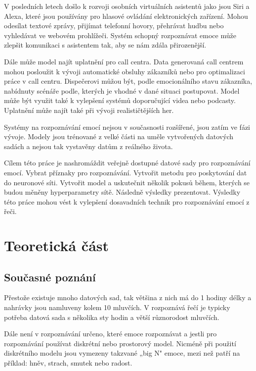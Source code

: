\documentclass[FM,BP]{tulthesis}
\begin{document}
V posledních letech došlo k rozvoji osobních virtuálních asistentů jako jsou Siri a Alexa, které jsou používány pro hlasové ovládání elektronických zařízení. Mohou odesílat textové zprávy, přijímat telefonní hovory, přehrávat hudbu nebo vyhledávat ve webovém prohlížeči. Systém schopný rozpoznávat emoce může zlepšit komunikaci s asistentem tak, aby se nám zdála přirozenější.\cite{DBLP:journals/corr/abs-1912-10458} 

Dále může model najít uplatnění pro call centra. Data generovaná call centrem mohou posloužit k vývoji automatické obsluhy zákazníků nebo pro optimalizaci práce v call centru. Dispečerovi můžou být, podle emocionálního stavu zákazníka, nabídnuty scénáře podle, kterých je vhodné v dané situaci postupovat. Model může být využit také k vylepšení systémů doporučující videa nebo podcasty. Uplatnění může najít také při vývoji realističtějších her. \cite{konar_chakraborty_2015}

Systémy na rozpoznávání emocí nejsou v současnosti rozšířené, jsou zatím ve fázi vývoje. Modely jsou trénované z velké části na uměle vytvořených datových sadách a nejsou tak vystavěny datům z reálného života. \cite{konar_chakraborty_2015}

Cílem této práce je nashromáždit veřejně dostupné datové sady pro rozpoznávání emocí. Vybrat příznaky pro rozpoznávání. Vytvořit metodu pro poskytování dat do neuronové síti. Vytvořit model a uskutečnit několik pokusů během, kterých se budou měněny hyperparametry sítě. Následně výsledky prezentovat. Výsledky této práce mohou vést k vylepšení dosavadních technik pro rozpoznávání emocí z řeči. 

\chapter{Teoretická část}

\section{Současné poznání}
Přestože existuje mnoho datových sad, tak většina z nich má do 1 hodiny délky a nahrávky jsou namluveny kolem 10 mluvčích. V rozpoznává řečí je typicky potřeba datová sada s několika sty hodin a větší různorodost mluvčích\cite{konar_chakraborty_2015}.

Dále není v rozpoznávání určeno, které emoce rozpoznávat a jestli pro rozpoznávání používat diskrétní nebo prostorový model. Nicméně při použití diskrétního modelu jsou vymezeny takzvané „big N" emoce, mezi než patří na příklad: hněv, strach, smutek nebo radost\cite{konar_chakraborty_2015}.
\end{document}
